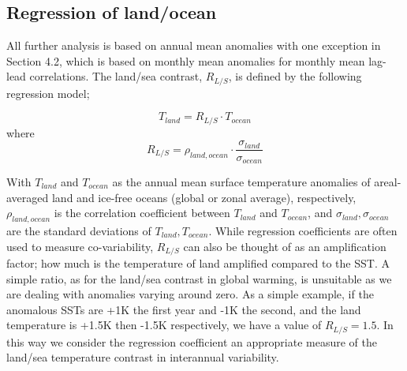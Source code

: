 \subsection{Regression of land/ocean}


All further analysis is based on annual mean anomalies with one exception in 
Section 4.2, which is based on monthly mean anomalies for monthly mean lag-lead
correlations. The land/sea contrast, $R_{L/S}$, is defined by the following 
regression model;

\begin{equation}
T_{land} = R_{L/S} \cdot T_{ocean}
\end{equation}
where
\begin{equation}
	R_{L/S} = \rho_{land,ocean}\cdot \frac{\sigma_{land}}{\sigma_{ocean}}
\end{equation}

With $T_{land}$ and $T_{ocean}$ as the annual mean surface temperature anomalies 
of areal-averaged land and ice-free oceans (global or zonal average), 
respectively, $\rho_{land,ocean}$ is the correlation coefficient between 
$T_{land}$ and $T_{ocean}$, and $\sigma_{land}, \sigma_{ocean}$ are the standard 
deviations of $T_{land}, T_{ocean}$. While regression coefficients are often 
used to measure co-variability, $R_{L/S}$ can also be thought of as an 
amplification factor; how much is the temperature of land amplified compared to 
the SST. A simple ratio, as for the land/sea contrast in global warming, is 
unsuitable as we are dealing with anomalies varying around zero. As a simple 
example, if the anomalous SSTs are +1K the first year and -1K the second, and 
the land temperature is +1.5K then -1.5K respectively, we have a value of 
$R_{L/S} = 1.5$. In this way we consider the regression coefficient an 
appropriate measure of the land/sea temperature contrast in interannual 
variability.